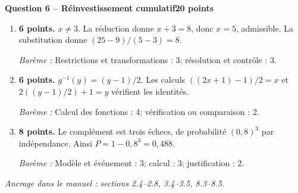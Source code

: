 \documentclass[11pt,a4paper]{article}
\begin{document}
\newpage
{\large\bfseries Question 6 -- Réinvestissement cumulatif}\hfill\textbf{20 points}\par
\begin{enumerate}
\item \textbf{6 points.} \(x\ne3\). La réduction donne \(x+3=8\), donc \(x=5\), admissible. La substitution donne \((25-9)/(5-3)=8\).
\par{\small\textit{Barème : }Restrictions et transformations : 3; résolution et contrôle : 3.}
\item \textbf{6 points.} \(g^{-1}(y)=(y-1)/2\). Les calculs \(((2x+1)-1)/2=x\) et \(2((y-1)/2)+1=y\) vérifient les identités.
\par{\small\textit{Barème : }Calcul des fonctions : 4; vérification ou comparaison : 2.}
\item \textbf{8 points.} Le complément est trois échecs, de probabilité \((0{,}8)^3\) par indépendance. Ainsi \(P=1-0{,}8^3=0{,}488\).
\par{\small\textit{Barème : }Modèle et événement : 3; calcul : 3; justification : 2.}
\end{enumerate}
\vfill {\small\textit{Ancrage dans le manuel : sections 2.4--2.8, 3.4--3.5, 8.3--8.5.}}
\end{document}
